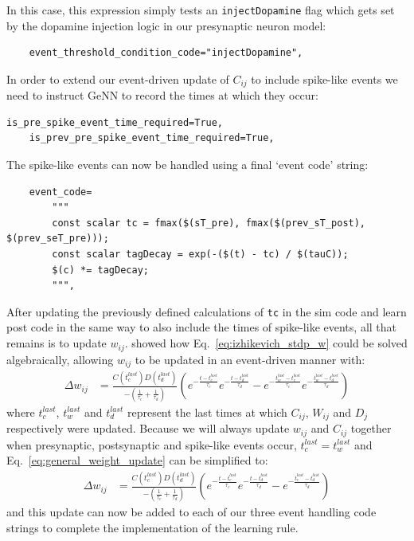 \documentclass[utf8]{frontiersSCNS} %
\begin{document}
In this case, this expression simply tests an \lstinline{injectDopamine} flag which gets set by the dopamine injection logic in our presynaptic neuron model:
%
\begin{lstlisting}
    event_threshold_condition_code="injectDopamine",
\end{lstlisting}
%
In order to extend our event-driven update of $C_{ij}$ to include spike-like events we need to instruct GeNN to record the times at which they occur:
%
\begin{lstlisting}[morekeywords={True}]
    is_pre_spike_event_time_required=True,
    is_prev_pre_spike_event_time_required=True,
\end{lstlisting}
%
The spike-like events can now be handled using a final `event code' string:
%
\begin{lstlisting}
    event_code=
        """
        const scalar tc = fmax($(sT_pre), fmax($(prev_sT_post), $(prev_seT_pre)));
        const scalar tagDecay = exp(-($(t) - tc) / $(tauC));
        $(c) *= tagDecay;
        """,
\end{lstlisting}
%
After updating the previously defined calculations of \lstinline{tc} in the sim code and learn post code in the same way to also include the times of spike-like events, all that remains is to update $w_{ij}$.
\citet{Mikaitis2018} showed how Eq.~\ref{eq:izhikevich_stdp_w} could be solved algebraically, allowing $w_{ij}$ to be updated in an event-driven manner with:
%
\begin{align}
    \Delta w_{ij} & = \frac{C(t_{c}^{last}) D(t_{d}^{last})}{-\left(\frac{1}{\tau_c} + \frac{1}{\tau_d}\right)} \left(e ^{-\frac{t - t_{c}^{last}}{\tau_c}} e ^{-\frac{t - t_{d}^{last}}{\tau_d}} - e ^{-\frac{t_{w}^{last} - t_{c}^{last}}{\tau_c}} e ^{-\frac{t_{w}^{last} - t_{d}^{last}}{\tau_d}}\right) \label{eq:general_weight_update}
\end{align}
%
where $t_{c}^{last}$, $t_{w}^{last}$ and $t_{d}^{last}$ represent the last times at which $C_{ij}$, $W_{ij}$ and $D_{j}$ respectively were updated.
Because we will always update $w_{ij}$ and $C_{ij}$ together when presynaptic, postsynaptic and spike-like events occur, $t_{c}^{last} = t_{w}^{last}$ and Eq.~\ref{eq:general_weight_update} can be simplified to:
%
\begin{align}
    \Delta w_{ij} & = \frac{C(t_{c}^{last}) D(t_{d}^{last})}{-\left(\frac{1}{\tau_c} + \frac{1}{\tau_d}\right)} \left(e ^{-\frac{t - t_{c}^{last}}{\tau_c}} e ^{-\frac{t - t_{d}^{last}}{\tau_d}} - e ^{-\frac{t_{c}^{last} - t_{d}^{last}}{\tau_d}}\right) \label{eq:general_weight_update2}
\end{align}
%
and this update can now  be added to each of our three event handling code strings to complete the implementation of the learning rule.
\end{document}
